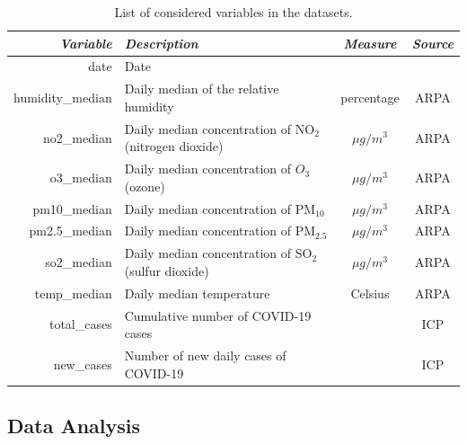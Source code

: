 \documentclass[review]{elsarticle}
\begin{document}
\begin{table}[h]
	\begin{center}
		\caption{List of considered variables in the datasets.}
	\label{tab:legend}
		\begin{tabular}{r p{5cm} cc}
			\itshape{Variable} & \itshape{Description} & \itshape{Measure} & \itshape{Source} \\
			\hline
			date & Date &&\\
			humidity\_median & Daily median of the relative humidity & percentage & ARPA \\
			no2\_median & Daily median concentration of NO$_{2}$ (nitrogen dioxide) & $ \mu g / m^{3} $ &  ARPA \\
			o3\_median & Daily median concentration of $O_{3}$ (ozone) & $ \mu g / m^{3} $ &  ARPA \\
			pm10\_median & Daily median concentration of PM$_{10}$ & $ \mu g / m^{3} $ &  ARPA \\
			pm2.5\_median & Daily median  concentration of PM$_{2.5}$ & $ \mu g / m^{3} $ &  ARPA \\
			so2\_median & Daily median concentration of SO$_{2}$ (sulfur dioxide) & $ \mu g / m^{3} $ &  ARPA \\
			temp\_median & Daily median temperature & Celsius &  ARPA \\
			total\_cases & Cumulative number of COVID-19 cases & &  ICP \\
			new\_cases & Number of new daily cases of COVID-19& &  ICP \\
			\hline
		\end{tabular}
	\end{center}
\end{table}

\subsection{Data Analysis}
\end{document}
